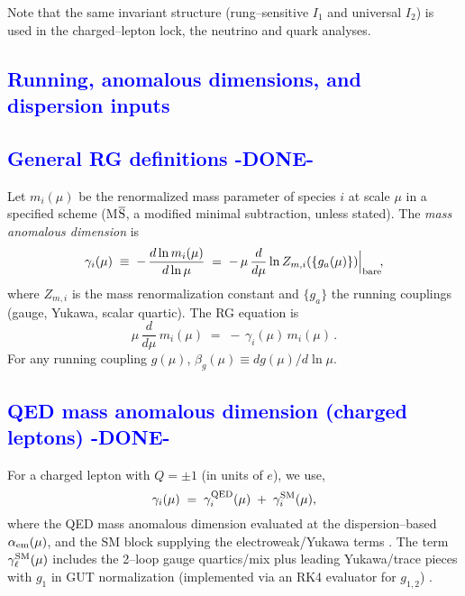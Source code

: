 \documentclass[%
 amsmath,amssymb,
 aps,
prb,
floatfix, showkeys
]{revtex4-2}
\newcommand{\modif}[1]{\textcolor{blue}{#1}}
\begin{document}
 Note that  the same invariant structure
 (rung--sensitive $I_1$ and universal $I_2$) is used in  the charged--lepton lock,
 the neutrino and quark analyses.












 




 
{\modif{
    \section{Running, anomalous dimensions, and dispersion inputs}
\label{sec:running}
}}


{\modif{
\subsection{General RG definitions  -DONE-}    
\label{subsec:rg_defs}
}}
Let $m_i(\mu)$ be the renormalized mass parameter of species $i$ at
scale $\mu$ in a specified scheme (M$\overline{\rm S}$, a modified minimal subtraction, unless stated).
The \emph{mass anomalous dimension} is
\begin{equation}
  \gamma_i(\mu) \;\equiv\; -\,\frac{d\ln m_i(\mu)}{d\ln\mu}
  \;=\; -\,\mu\,\frac{d}{d\mu}\ln Z_{m,i}(\{g_a(\mu)\})\Big|_{\rm bare}\!,
  \label{eq:gamma_def}
\end{equation}
where $Z_{m,i}$ is the mass renormalization constant and $\{g_a\}$ the running couplings (gauge, Yukawa, scalar quartic). The RG equation is
\begin{equation}
  \mu\,\frac{d}{d\mu}\,m_i(\mu) \;=\; -\,\gamma_i(\mu)\,m_i(\mu)\,.
  \label{eq:RGE_mass}
\end{equation}
For any running coupling $g(\mu)$, $\beta_g(\mu)\equiv d g(\mu)/d\ln\mu$.





{\modif{
\subsection{QED mass anomalous dimension (charged leptons) -DONE-}  
\label{subsec:qed_ad}
}}
For a charged lepton with $Q=\pm 1$ (in units of $e$), we use, 
\begin{equation}
  \gamma_i(\mu)\;=\;\gamma^{\rm QED}_i(\mu)\;+\;\gamma^{\rm SM}_i(\mu),
\end{equation}
where the QED mass anomalous dimension evaluated at the dispersion--based $\alpha_{\rm em}(\mu)$,
and the SM block supplying the electroweak/Yukawa terms  \cite{Tarrach1981}.
The term $\gamma^{\rm SM}_\ell(\mu)$ includes the 2--loop gauge quartics/mix plus leading
Yukawa/trace pieces with $g_1$ in GUT normalization (implemented via an RK4 evaluator
for $g_{1,2}$) \cite{MachacekVaughn1983-85,Buttazzo2013}.
  
\end{document}
